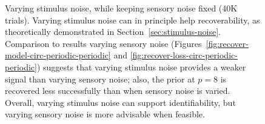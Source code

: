 \documentclass[si.tex]{subfiles}
\begin{document}
\begin{figure}
\caption{Varying stimulus noise, while keeping sensory noise fixed (40K trials).
Varying stimulus noise can in principle help recoverability, as theoretically demonstrated in Section~\ref{sec:stimulus-noise}.
Comparison to results varying sensory noise (Figures~\ref{fig:recover-model-circ-periodic-periodic} and  \ref{fig:recover-loss-circ-periodic-periodic}) suggests that varying stimulus noise provides a weaker signal than varying sensory noise; also, the prior at $p=8$ is recovered less successfully than when sensory noise is varied.
Overall, varying stimulus noise can support identifiability, but varying sensory noise is more advisable when feasible.
}\label{fig:stim-noise}

\end{figure}
\end{document}
